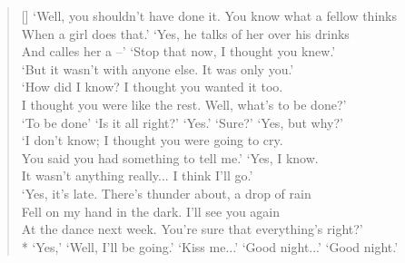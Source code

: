 \documentclass[MAIN]{subfiles}
\begin{document}
\begin{verse}[\versewidth]
`Well, you shouldn't have done it. You know what a fellow thinks\\
When a girl does that.' `Yes, he talks of her over his drinks\\
And calles her a --' `Stop that now, I thought you knew.'\\
`But it wasn't with anyone else. It was only you.'\\
`How did I know? I thought you wanted it too.\\
I thought you were like the rest. Well, what's to be done?'\\
`To be done' `Is it all right?' `Yes.' `Sure?' `Yes, but why?'\\
`I don't know; I thought you were going to cry.\\
You said you had something to tell me.' `Yes, I know.\\
It wasn't anything really... I think I'll go.'\\
`Yes, it's late. There's thunder about, a drop of rain\\
Fell on my hand in the dark. I'll see you again\\
At the dance next week. You're sure that everything's right?'\\*
`Yes,' `Well, I'll be going.' `Kiss me...' `Good night...' `Good night.'
\end{verse}
\end{document}
